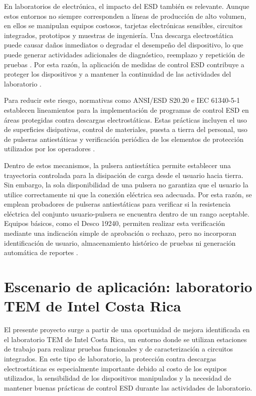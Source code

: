 En laboratorios de electrónica, el impacto del ESD también es relevante. Aunque estos
entornos no siempre corresponden a líneas de producción de alto volumen, en ellos se
manipulan equipos costosos, tarjetas electrónicas sensibles, circuitos integrados,
prototipos y muestras de ingeniería. Una descarga electrostática puede causar daños
inmediatos o degradar el desempeño del dispositivo, lo que puede generar actividades
adicionales de diagnóstico, reemplazo y repetición de pruebas
\cite{ESDA1,TI2014}. Por esta razón, la aplicación de medidas de control ESD
contribuye a proteger los dispositivos y a mantener la continuidad de las actividades
del laboratorio \cite{ESDAPrinciples2}.

Para reducir este riesgo, normativas como ANSI/ESD S20.20 e IEC 61340-5-1 establecen
lineamientos para la implementación de programas de control ESD en áreas protegidas
contra descargas electrostáticas. Estas prácticas incluyen el uso de superficies disipativas,
control de materiales, puesta a tierra del personal, uso de pulseras antiestáticas y
verificación periódica de los elementos de protección utilizados por los operadores
\cite{ESDAPrinciples2}.

Dentro de estos mecanismos, la pulsera antiestática permite establecer una trayectoria
controlada para la disipación de carga desde el usuario hacia tierra. Sin embargo, la sola
disponibilidad de una pulsera no garantiza que el usuario la utilice correctamente ni que
la conexión eléctrica sea adecuada. Por esta razón, se emplean probadores de pulseras
antiestáticas para verificar si la resistencia eléctrica del conjunto usuario-pulsera se
encuentra dentro de un rango aceptable. Equipos básicos, como el Desco 19240, permiten
realizar esta verificación mediante una indicación simple de aprobación o rechazo, pero no
incorporan identificación de usuario, almacenamiento histórico de pruebas ni generación
automática de reportes \cite{Desco_19240}.

\section{Escenario de aplicación: laboratorio TEM de Intel Costa Rica}

El presente proyecto surge a partir de una oportunidad de mejora identificada en el
laboratorio TEM de Intel Costa Rica, un entorno donde se utilizan estaciones de trabajo
para realizar pruebas funcionales y de caracterización a circuitos integrados. En este tipo
de laboratorio, la protección contra descargas electrostáticas es especialmente importante
debido al costo de los equipos utilizados, la sensibilidad de los dispositivos manipulados y
la necesidad de mantener buenas prácticas de control ESD durante las actividades de
laboratorio.

